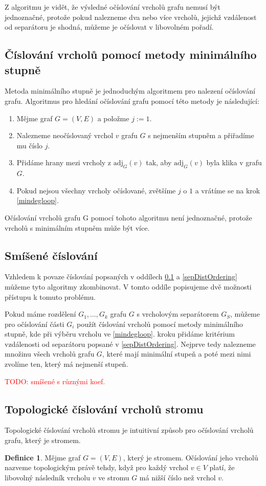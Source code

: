 \documentclass[11pt,american,czech,oneside]{book}
\theoremstyle{plain}
\theoremstyle{definition}
\newtheorem{definition}{Definice}
\newcommand{\TODO}[1]{\textcolor{red}{TODO: #1}\PackageWarning{TODO:}{TODO: #1!}}
\begin{document}
Z algoritmu je vidět, že výsledné očíslování vrcholů grafu nemusí být jednoznačné, protože pokud nalezneme dva nebo více vrcholů, jejichž vzdálenost od separátoru je shodná, můžeme je očíslovat v libovolném pořadí.

\subsection{Číslování vrcholů pomocí metody minimálního stupně}
\label{MDordering}
Metoda minimálního stupně je jednoduchým algoritmem pro nalezení očíslování grafu. Algoritmus pro hledání očíslování grafu pomocí této metody je následující:

\begin{enumerate}
  \item Mějme graf $G=(V,E)$ a položme $j:=1$.
  \item \label{mindegloop}
      Nalezneme neočíslovaný vrchol $v$ grafu $G$ s nejmenším stupněm a přiřadíme mu číslo $j$.
  \item Přidáme hrany mezi vrcholy z $\mathrm{adj}_G(v)$ tak, aby $\mathrm{adj}_G(v)$ byla klika v grafu $G$.
  \item Pokud nejsou všechny vrcholy očíslované, zvětšíme $j$ o $1$ a vrátíme se na krok \ref{mindegloop}.
\end{enumerate}

Očíslování vrcholů grafu G pomocí tohoto algoritmu není jednoznačné, protože vrcholů s minimálním stupněm může být více.

\subsection{Smíšené číslování}
Vzhledem k povaze číslování popsaných v oddílech \ref{MDordering} a \ref{sepDistOrdering} můžeme tyto algoritmy zkombinovat. V tomto oddíle popisujeme dvě možnosti přístupu k tomuto problému.

Pokud máme rozdělení $G_1, \ldots, G_k$ grafu $G$ s vrcholovým separátorem $G_S$, můžeme pro očíslování části $G_i$ použít číslování vrcholů pomocí metody minimálního stupně, kde při výběru vrcholu ve \ref{mindegloop}. kroku přidáme kritérium vzdálenosti od separátoru popsané v \ref{sepDistOrdering}. Nejprve tedy nalezneme množinu všech vrcholů grafu $G$, které mají minimální stupeň a poté mezi nimi zvolíme ten, který má nejmenší stupeň.

\TODO{smíšené s různými koef.}

\subsection{Topologické číslování vrcholů stromu}
Topologické číslování vrcholů stromu je intuitivní způsob pro očíslování vrcholů grafu, který je stromem.
\begin{definition}
    Mějme graf $G = (V,E)$, který je stromem. Očíslování jeho vrcholů nazveme topologickým právě tehdy,
    když pro každý vrchol $v \in V$ platí, že libovolný následník vrcholu $v$ ve stromu $G$ má nižší číslo než vrchol $v$.
\end{definition}
\end{document}
